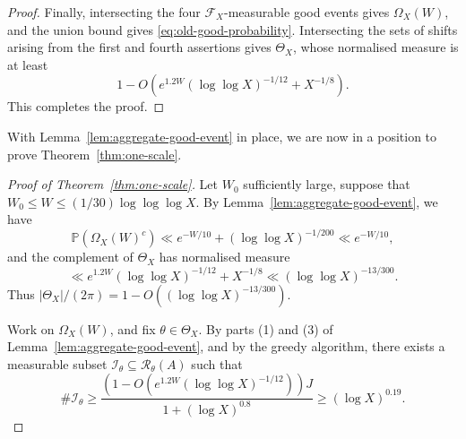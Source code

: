 \documentclass[a4paper,12pt,reqno]{amsart}
\numberwithin{equation}{section}
\theoremstyle{remark}
\newcommand{\p}{\mathbb{P}}
\begin{document}
\begin{proof}
Finally, intersecting the four \(\mathscr F_X\)-measurable good events
gives \(\Omega_X(W)\), and the union bound gives
\eqref{eq:old-good-probability}. Intersecting the sets of shifts arising
from the first and fourth assertions gives \(\Theta_X\), whose normalised
measure is at least
\[
 1-O\left(
 e^{1.2W}(\log\log X)^{-1/12}+X^{-1/8}
 \right).
\]
This completes the proof.
\end{proof}

With Lemma~\ref{lem:aggregate-good-event} in place, we are now in a position to
prove Theorem~\ref{thm:one-scale}.

\begin{proof}[Proof of Theorem~\ref{thm:one-scale}]
Let $W_0$ sufficiently large,  suppose that
\(
 W_0\leq W\leq (1/{30})\log\log\log X.
\)
By Lemma~\ref{lem:aggregate-good-event}, we have
\[
 \p(\Omega_X(W)^c)
 \ll e^{-W/10}+(\log\log X)^{-1/200}\ll e^{-W/10},
\]
and the complement of
\(\Theta_X\) has normalised measure
\[
 \ll e^{1.2W}(\log\log X)^{-1/12}+X^{-1/8}
 \ll(\log\log X)^{-13/300}.
\]
Thus \(|\Theta_X|/(2\pi)=
 1-O\left(
 (\log\log X)^{-13/300}
 \right)\). 

Work on \(\Omega_X(W)\), and fix \(\theta\in\Theta_X\).
By parts (1) and (3) of Lemma~\ref{lem:aggregate-good-event}, and by the greedy algorithm, there exists a measurable
subset \(\mathcal I_\theta\subseteq\mathcal R_\theta(A)\) such that
\begin{equation}\label{eq:independent-set-size}
 \#\mathcal I_\theta
 \geq
 \frac{\left(
  1-O\left(e^{1.2W}(\log\log X)^{-1/12}\right)
  \right)J}{1+(\log X)^{0.8}}
 \geq(\log X)^{0.19}.
\end{equation}


\end{proof}
\end{document}
